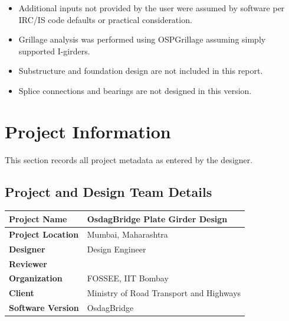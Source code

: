 \documentclass[12pt,a4paper]{report}
\numberwithin{table}{chapter}
\numberwithin{figure}{chapter}
\begin{document}
\begin{itemize}
\item Additional inputs not provided by the user were assumed by software per IRC/IS code defaults or practical consideration.
\item Grillage analysis was performed using OSPGrillage assuming simply supported I-girders.
\item Substructure and foundation design are not included in this report.
\item Splice connections and bearings are not designed in this version.
\end{itemize}

\titleformat{\chapter}[block]{\normalfont\Large\bfseries\centering}{\thechapter}{1em}{}
\titlespacing*{\chapter}{0pt}{-30pt}{10pt}


\chapter{Project Information}

This section records all project metadata as entered by the designer.

\section{Project and Design Team Details}
\label{sec:project-details}

\begin{tabular}{|L{5.5cm}|L{8.5cm}|}
\hline
\textbf{Project Name} & OsdagBridge Plate Girder Design \\
\hline
\textbf{Project Location} & Mumbai, Maharashtra \\
\hline
\textbf{Designer} & Design Engineer \\
\hline
\textbf{Reviewer} &  \\
\hline
\textbf{Organization} & FOSSEE, IIT Bombay \\
\hline
\textbf{Client} & Ministry of Road Transport and Highways \\
\hline
\textbf{Software Version} & OsdagBridge \\
\hline
\end{tabular}
\end{document}
